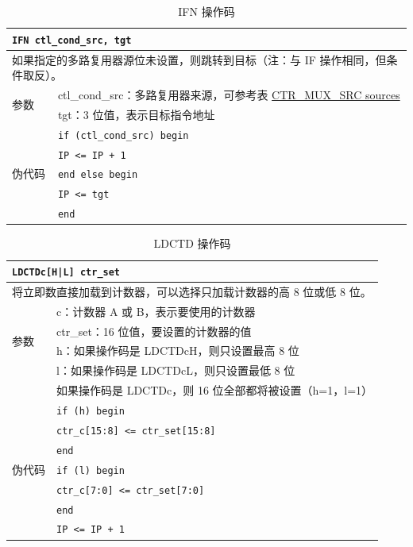 \documentclass[main\_\_CN.tex]{subfiles}
\begin{document}
\begin{table}[H]
\caption{IFN 操作码}
\label{tab:bitscrm-ifn-opcode}
\begin{tabular}{|l|l|}
\hline
\multicolumn{2}{|l|}{\texttt{IFN ctl\_cond\_src, tgt}} \\
\hline
\multicolumn{2}{|L{17cm}|}{如果指定的多路复用器源位未设置，则跳转到目标（注：与 IF 操作相同，但条件取反）。} \\
\hline
\multirow{2}{*}{参数} & ctl\_cond\_src：多路复用器来源，可参考表 \hyperref[tab:bitscrm-ctrmuxsrc]{CTR\_MUX\_SRC sources} \\
& tgt：3 位值，表示目标指令地址 \\
\hline
\multirow{5}{*}{伪代码} & \texttt{if (ctl\_cond\_src) begin} \\
& \hspace*{4mm} \texttt{IP <= IP + 1} \\
& \texttt{end else begin} \\
& \hspace*{4mm} \texttt{IP <= tgt} \\
& \texttt{end} \\
\hline
\end{tabular}
\end{table}


\begin{table}[H]
\caption{LDCTD 操作码}
\label{tab:bitscrm-ldctd-opcode}
\begin{tabular}{|l|l|}
\hline
\multicolumn{2}{|l|}{\texttt{LDCTDc[H|L] ctr\_set}} \\
\hline
\multicolumn{2}{|L{17cm}|}{将立即数直接加载到计数器，可以选择只加载计数器的高 8 位或低 8 位。} \\
\hline
\multirow{4}{*}{参数} & c：计数器 A 或 B，表示要使用的计数器 \\
& ctr\_set：16 位值，要设置的计数器的值  \\
& h：如果操作码是 LDCTDcH，则只设置最高 8 位 \\
& l：如果操作码是 LDCTDcL，则只设置最低 8 位 \\
& 如果操作码是 LDCTDc，则 16 位全部都将被设置（h=1，l=1）\\
\hline
\multirow{7}{*}{伪代码} & \texttt{if (h) begin} \\
& \hspace*{4mm} \texttt{ctr\_c[15:8] <= ctr\_set[15:8]} \\
& \texttt{end} \\
& \texttt{if (l) begin} \\
& \hspace*{4mm} \texttt{ctr\_c[7:0] <= ctr\_set[7:0]} \\
& \texttt{end} \\
& \texttt{IP <= IP + 1} \\
\hline
\end{tabular}
\end{table}
\end{document}
